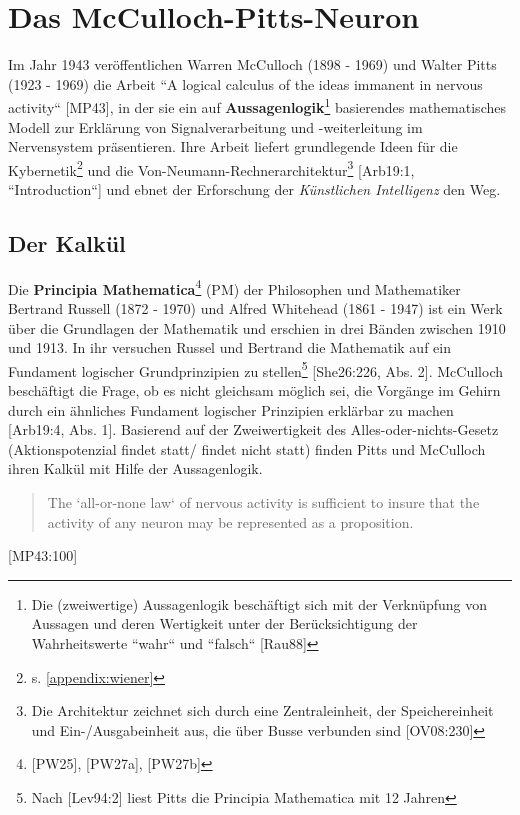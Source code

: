 \section{Das McCulloch-Pitts-Neuron}

Im Jahr 1943 veröffentlichen Warren McCulloch (1898 - 1969) und Walter Pitts (1923 - 1969) die Arbeit ``A logical calculus of the ideas immanent in nervous activity`` [MP43], in der sie ein auf \textbf{Aussagenlogik}\footnote{
    Die (zweiwertige) Aussagenlogik beschäftigt sich mit der Verknüpfung von Aussagen und deren Wertigkeit unter der Berücksichtigung der Wahrheitswerte ``wahr`` und ``falsch`` [Rau88]
} basierendes mathematisches Modell zur Erklärung von Signalverarbeitung und  -weiterleitung im Nervensystem präsentieren.
Ihre Arbeit liefert grundlegende Ideen für die Kybernetik\footnote{
    s. \ref{appendix:wiener}
} und die Von-Neumann-Rechnerarchitektur\footnote{
    Die Architektur zeichnet sich durch eine Zentraleinheit, der Speichereinheit und Ein-/Ausgabeinheit aus, die über Busse verbunden sind [OV08:230]
} [Arb19:1, ``Introduction``] und ebnet der Erforschung der \textit{Künstlichen Intelligenz} den Weg.


\subsection{Der Kalkül}

Die \textbf{Principia Mathematica}\footnote{
    [PW25], [PW27a], [PW27b]
} (PM) der Philosophen und Mathematiker Bertrand Russell (1872 - 1970) und Alfred Whitehead (1861 - 1947) ist ein Werk über die Grundlagen der Mathematik und erschien in drei Bänden zwischen 1910 und 1913. In ihr versuchen Russel und Bertrand die Mathematik auf ein Fundament logischer Grundprinzipien zu stellen\footnote{
    Nach [Lev94:2] liest Pitts die Principia Mathematica mit 12 Jahren
} [She26:226, Abs. 2].
McCulloch beschäftigt die Frage, ob es nicht gleichsam möglich sei, die Vorgänge im Gehirn durch ein ähnliches Fundament logischer Prinzipien erklärbar zu machen [Arb19:4, Abs. 1]. Basierend auf der Zweiwertigkeit des Alles-oder-nichts-Gesetz (Aktionspotenzial findet statt/ findet nicht statt) finden Pitts und McCulloch ihren Kalkül mit Hilfe der Aussagenlogik.\\

\blockquote{
    The `all-or-none law` of nervous activity is sufficient to insure that the activity of any neuron may be represented as a proposition.
}[MP43:100]\\

